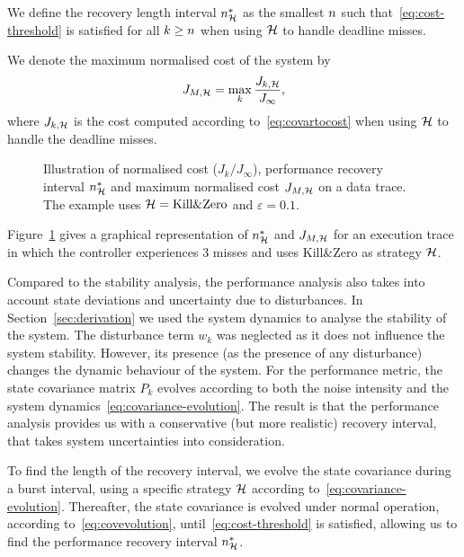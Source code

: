 \begin{definition}%
\label{def:recovery-lenght-interval}%
    We define the recovery length interval $n^*_{\mathcal{H}}$ as the smallest $n$ such that~\eqref{eq:cost-threshold} is satisfied for all $k \geq n$ when using $\mathcal{H}$ to handle deadline misses.
\end{definition}

\begin{definition}%
\label{def:maximum-system-cost}%
    We denote the maximum normalised cost of the system by
    \begin{equation}
        J_{M,\mathcal{H}} = \max_k \frac{J_{k, \mathcal{H}}}{J_\infty},
    \end{equation}
    where $J_{k,\mathcal{H}}$ is the cost computed according to~\eqref{eq:covartocost} when using $\mathcal{H}$ to handle the deadline misses.
\end{definition}
\begin{figure}[t]
    \centering
     
    \caption{Illustration of normalised cost ($J_k/J_\infty$), performance recovery interval $n^*_{\mathcal{H}}$ and maximum normalised cost $J_{M,\mathcal{H}}$ on a data trace. The example uses $\mathcal{H} = \text{Kill\&Zero}$ and $\varepsilon=0.1$.}
    \label{fig:recoveryandpeak}
\end{figure}
Figure~\ref{fig:recoveryandpeak} gives a graphical representation of $n^*_{\mathcal{H}}$ and $J_{M,\mathcal{H}}$ for an execution trace in which the controller experiences 3 misses and uses Kill\&Zero as strategy $\mathcal{H}$.

Compared to the stability analysis, the performance analysis also takes into account state deviations and uncertainty due to disturbances.
In Section~\ref{sec:derivation} we used the system dynamics to analyse the stability of the system.
The disturbance term $w_k$ was neglected as it does not influence the system stability.
However, its presence (as the presence of any disturbance) changes the dynamic behaviour of the system.
For the performance metric, the state covariance matrix $P_k$ evolves according to both the noise intensity and the system dynamics~\eqref{eq:covariance-evolution}.
The result is that the performance analysis provides us with a conservative (but more realistic) recovery interval, that takes system uncertainties into consideration.

To find the length of the recovery interval, we evolve the state covariance during a burst interval, using a specific strategy $\mathcal{H}$ according to~\eqref{eq:covariance-evolution}.
Thereafter, the state covariance is evolved under normal operation, according to~\eqref{eq:covevolution}, until~\eqref{eq:cost-threshold} is satisfied, allowing us to find the performance recovery interval $n^*_{\mathcal{H}}$.
